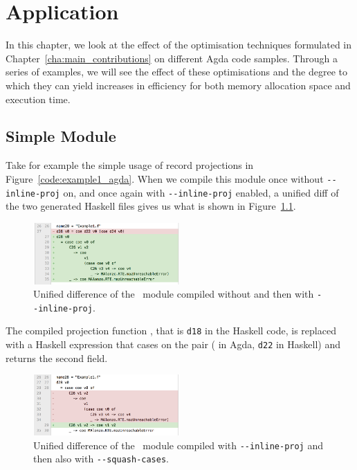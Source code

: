 \chapter{Application}
\label{cha:application}

In this chapter, we look at the effect of the optimisation techniques formulated in Chapter~\ref{cha:main_contributions} on different Agda code samples. Through a series of examples, we will see the effect of these optimisations and the degree to which they can yield increases in efficiency for both memory allocation space and execution time.

\section{Simple Module}



Take for example the simple usage of record projections in Figure~\ref{code:example1_agda}. When we compile this module once without \texttt{-{}-inline-proj} on, and once again with \texttt{-{}-inline-proj} enabled, a unified diff of the two generated Haskell files gives us what is shown in Figure~\ref{fig:Example1_inline}.

\begin{figure}[h!]
    \centering
    \includegraphics[width=0.5\textwidth]{Figures/Example1_inline}
    \caption{Unified difference of the ~module compiled without and then with \texttt{-{}-inline-proj}.}
    \label{fig:Example1_inline}
\end{figure}

The compiled projection function , that is \lstinline{d18} in the Haskell code, is replaced with a Haskell expression that cases on the pair ( in Agda, \lstinline{d22} in Haskell) and returns the second field.

\begin{figure}[h!]
    \centering
    \includegraphics[width=0.5\textwidth]{Figures/Example1_squash}
    \caption{Unified difference of the ~module compiled  with \texttt{-{}-inline-proj} and then also with \texttt{-{}-squash-cases}.}
    \label{fig:Example1_squash}
\end{figure}

